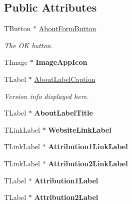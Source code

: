 \subsection*{Public Attributes}
\begin{DoxyCompactItemize}
\item 
\mbox{\label{class_t_about_form_add3f256ba4f1ed42204c0e77c0d71552}} 
T\+Button $\ast$ \mbox{\hyperlink{class_t_about_form_add3f256ba4f1ed42204c0e77c0d71552}{About\+Form\+Button}}
\begin{DoxyCompactList}\small\item\em The OK button. \end{DoxyCompactList}\item 
\mbox{\label{class_t_about_form_a3c3968d0c1473343931bdd0ac25d99ab}} 
T\+Image $\ast$ {\bfseries Image\+App\+Icon}
\item 
\mbox{\label{class_t_about_form_aa188b96e0810fb8944b8e7fd7a2deea4}} 
T\+Label $\ast$ \mbox{\hyperlink{class_t_about_form_aa188b96e0810fb8944b8e7fd7a2deea4}{About\+Label\+Caption}}
\begin{DoxyCompactList}\small\item\em Version info displayed here. \end{DoxyCompactList}\item 
\mbox{\label{class_t_about_form_a0d1afa81071159368263c6a1d1ed0c7d}} 
T\+Label $\ast$ {\bfseries About\+Label\+Title}
\item 
\mbox{\label{class_t_about_form_a809ee5cebba2a7638a31540c5b40cb28}} 
T\+Link\+Label $\ast$ {\bfseries Website\+Link\+Label}
\item 
\mbox{\label{class_t_about_form_ab5ff9a28b7aa8db5c5723c8e48c4f2e1}} 
T\+Link\+Label $\ast$ {\bfseries Attribution1\+Link\+Label}
\item 
\mbox{\label{class_t_about_form_a4f86b2ad44b1d3de8daac70528a1a3a5}} 
T\+Link\+Label $\ast$ {\bfseries Attribution2\+Link\+Label}
\item 
\mbox{\label{class_t_about_form_a0ff4e741e1c1c280733c3a9ccde35413}} 
T\+Label $\ast$ {\bfseries Attribution1\+Label}
\item 
\mbox{\label{class_t_about_form_adfcb216e6b70a6369dd33837e8875503}} 
T\+Label $\ast$ {\bfseries Attribution2\+Label}
\end{DoxyCompactItemize}
